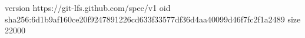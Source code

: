 version https://git-lfs.github.com/spec/v1
oid sha256:6d1b9af160ce20f9247891226cd633f33577df36d4aa40099d46f7fc2f1a2489
size 22000
